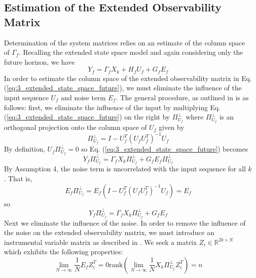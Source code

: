 \subsection{Estimation of the Extended Observability Matrix}\label{sec:estimation_of_the_extended_observability_matrix}
Determination of the system matrices relies on an estimate of the column space of $\Gamma_f$. Recalling the extended state space model and again considering only the future horizon, we have
\begin{equation}\label{eq:3_extended_state_space_future}
Y_f = \Gamma_f X_k + H_f U_f + G_f E_f
\end{equation}
In order to estimate the column space of the extended observability matrix in Eq. (\ref{eq:3_extended_state_space_future}), we must eliminate the influence of the input sequence $U_f$ and noise term $E_f$. The general procedure, as outlined in \cite{qin2006overview, verhaegen2007filtering} is as follows: first, we eliminate the influence of the input by multiplying Eq. (\ref{eq:3_extended_state_space_future}) on the right by $\Pi_{U_f}^\perp$ where $\Pi_{U_f}^\perp$ is an orthogonal projection onto the column space of $U_f$ given by
\begin{equation*}
\Pi_{U_f}^\perp = I - U_f^T(U_f U_f^T)^{-1}U_f
\end{equation*}
By definition, $U_f\Pi_{U_f}^\perp = 0$ so Eq. (\ref{eq:3_extended_state_space_future}) becomes
\begin{equation}
Y_f\Pi_{U_f}^\perp = \Gamma_f X_k\Pi_{U_f}^\perp + G_f E_f\Pi_{U_f}^\perp
\end{equation}
By Assumption 4, the noise term is uncorrelated with the input sequence for all $k$. That is,
\begin{equation*}
E_f \Pi_{U_f}^\perp = E_f(I-U_f^T(U_fU_f^T)^{-1}U_f) = E_f
\end{equation*}
so
\begin{equation}\label{eq:3_extended_state_space_noinput}
Y_f\Pi_{U_f}^\perp = \Gamma_f X_k\Pi_{U_f}^\perp + G_f E_f
\end{equation}
Next we eliminate the influence of the noise. In order to remove the influence of the noise on the extended observability matrix, we must introduce an instrumental variable matrix as described in \cite{verhaegen2007filtering}. We seek a matrix $Z_i \in \mathbb{R}^{2k\times N}$ which exhibits the following properties:
\begin{subequations}\begin{equation}\label{eq:3_instrumental_a}
\lim_{N\rightarrow\infty} \frac{1}{N} E_f Z_i^T = 0
\end{equation}
\begin{equation}\label{eq:3_instrumental_b}
\mbox{rank}\left(\lim_{N\rightarrow\infty} \frac{1}{N} X_k \Pi_{U_f}^\perp Z_i^T\right) = n
\end{equation}
\end{subequations}
